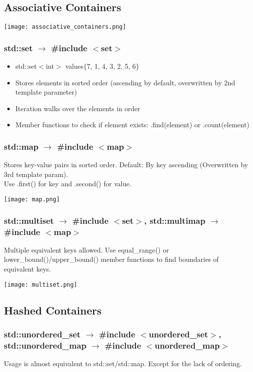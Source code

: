 \subsection{Associative Containers}
\begin{center}
    \texttt{[image: associative\_containers.png]}
\end{center}
\subsubsection{std::set $\rightarrow$ \#include $<$set$>$}
\begin{itemize}
    \item std::set$<$int$>$ values$\{$7, 1, 4, 3, 2, 5, 6$\}$
    \item Stores elements in sorted order (ascending by default, overwritten by 2nd template parameter)
    \item Iteration walks over the elements in order
    \item Member functions to check if element exists: .find(element) or .count(element)
\end{itemize}
\subsubsection{std::map $\rightarrow$ \#include $<$map$>$}
Stores key-value pairs in sorted order. Default: By key ascending (Overwritten by 3rd template param).\\
Use .first() for key and .second() for value.
\begin{center}
    \texttt{[image: map.png]}
\end{center}
\subsubsection{std::multiset $\rightarrow$ \#include $<$set$>$, std::multimap $\rightarrow $\#include $<$map$>$}
Multiple equivalent keys allowed. Use equal\_range() or lower\_bound()/upper\_bound() member functions to find boundaries of equivalent keys.
\begin{center}
    \texttt{[image: multiset.png]}
\end{center}
\subsection{Hashed Containers}
\subsubsection{std::unordered\_set $\rightarrow$ \#include $<$unordered\_set$>$, std::unordered\_map $\rightarrow$ \#include $<$unordered\_map$>$}
Usage is almost equivalent to std::set/std::map. Except for the lack of ordering.

